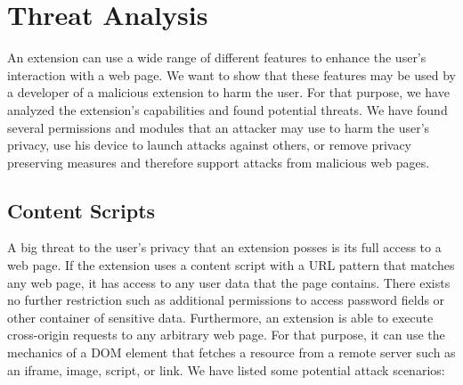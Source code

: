 
\chapter{Threat Analysis}

	An extension can use a wide range of different features to enhance the user's interaction with a web page. We want to show that these features may be used by a developer of a malicious extension to harm the user. For that purpose, we have analyzed the extension's capabilities and found potential threats. We have found several permissions and modules that an attacker may use to harm the user's privacy, use his device to launch attacks against others, or remove privacy preserving measures and therefore support attacks from malicious web pages. %

\section{Content Scripts}

	A big threat to the user's privacy that an extension posses is its full access to a web page. If the extension uses a content script with a URL pattern that matches any web page, it has access to any user data that the page contains. There exists no further restriction such as additional permissions to access password fields or other container of sensitive data. Furthermore, an extension is able to execute cross-origin requests to any arbitrary web page. For that purpose, it can use the mechanics of a DOM element that fetches a resource from a remote server such as an iframe, image, script, or link. We have listed some potential attack scenarios:
	
